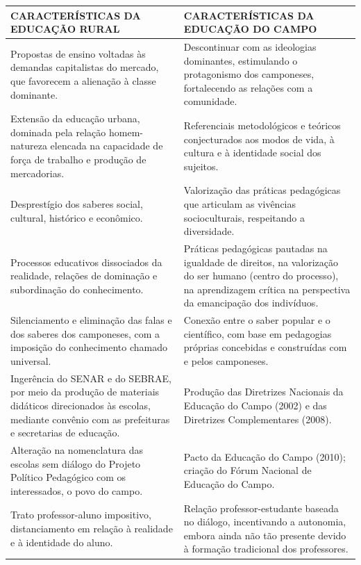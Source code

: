 \documentclass[
  12pt,
  openright,
  twoside,
  a4paper,
  english,
  brazilian,
  sumario=tradicional
]{abntex2}
\begin{document}
\begin{quadro}
\caption{Principais características da Educação Rural e da Educação do Campo}
\label{qua:quadro1}
\small
\renewcommand{\arraystretch}{1.3}
\begin{tabularx}{\textwidth}{>{\RaggedRight\arraybackslash}X >{\RaggedRight\arraybackslash}X}
\hline
\textbf{CARACTERÍSTICAS DA EDUCAÇÃO RURAL} & \textbf{CARACTERÍSTICAS DA EDUCAÇÃO DO CAMPO} \\
\hline
Propostas de ensino voltadas às demandas capitalistas do mercado, que favorecem a alienação à classe dominante. & Descontinuar com as ideologias dominantes, estimulando o protagonismo dos camponeses, fortalecendo as relações com a comunidade. \\
\hline
Extensão da educação urbana, dominada pela relação homem-natureza elencada na capacidade de força de trabalho e produção de mercadorias. & Referenciais metodológicos e teóricos conjecturados aos modos de vida, à cultura e à identidade social dos sujeitos. \\
\hline
Desprestígio dos saberes social, cultural, histórico e econômico. & Valorização das práticas pedagógicas que articulam as vivências socioculturais, respeitando a diversidade. \\
\hline
Processos educativos dissociados da realidade, relações de dominação e subordinação do conhecimento. & Práticas pedagógicas pautadas na igualdade de direitos, na valorização do ser humano (centro do processo), na aprendizagem crítica na perspectiva da emancipação dos indivíduos. \\
\hline
Silenciamento e eliminação das falas e dos saberes dos camponeses, com a imposição do conhecimento chamado universal. & Conexão entre o saber popular e o científico, com base em pedagogias próprias concebidas e construídas com e pelos camponeses. \\
\hline
Ingerência do SENAR e do SEBRAE, por meio da produção de materiais didáticos direcionados às escolas, mediante convênio com as prefeituras e secretarias de educação. & Produção das Diretrizes Nacionais da Educação do Campo (2002) e das Diretrizes Complementares (2008). \\
\hline
Alteração na nomenclatura das escolas sem diálogo do Projeto Político Pedagógico com os interessados, o povo do campo. & Pacto da Educação do Campo (2010); criação do Fórum Nacional de Educação do Campo. \\
\hline
Trato professor-aluno impositivo, distanciamento em relação à realidade e à identidade do aluno. & Relação professor-estudante baseada no diálogo, incentivando a autonomia, embora ainda não tão presente devido à formação tradicional dos professores. \\
\hline
\end{tabularx}
\end{quadro}
\end{document}
